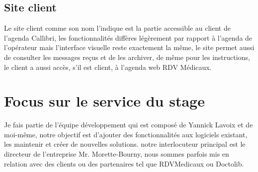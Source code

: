 \subsection{Site client}
Le site client comme son nom l'indique est la partie accessible au client de l'agenda \gls{Callibri},
les fonctionnalités diffères légèrement par rapport à l'agenda de l'opérateur mais l'interface 
visuelle reste exactement la même, le site permet aussi de consulter les messages reçus et de les archiver, de même pour les instructions,
le client a aussi accès, s'il est client, à l'agenda web RDV Médicaux.\newline


\section{Focus sur le service du stage}
Je fais partie de l'équipe développement qui est composé de Yannick Lavoix et de moi-même, 
notre objectif est d'ajouter des fonctionnalités aux logiciels existant, 
les maintenir et créer de nouvelles solutions. notre interlocuteur principal est le directeur
de l'entreprise Mr. Morette-Bourny, nous sommes parfois mis en relation avec des clients 
ou des partenaires tel que RDVMedicaux ou Doctolib. \newline

